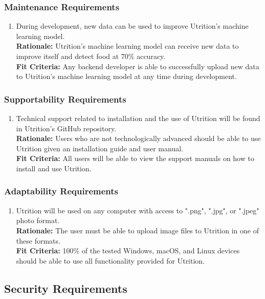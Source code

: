 \documentclass[12pt]{article}
\begin{document}
\subsubsection{Maintenance Requirements}
\begin{enumerate}[{MS}1. ] 
	\item During development, new data can be used to improve Utrition’s machine learning model.\\
	\textbf{Rationale:} Utrition’s machine learning model can receive new data to improve itself and detect food at 70\% accuracy.\\	
	\textbf{Fit Criteria:} Any backend developer is able to successfully upload new data to Utrition’s machine learning model at any time during development. 
\end{enumerate}

\subsubsection{Supportability Requirements}
\begin{enumerate}[{MS}2. ] 
	\item Technical support related to installation and the use of Utrition will be found in Utrition’s GitHub repository. \\
	\textbf{Rationale:} Users who are not technologically advanced should be able to use Utrition given an installation guide and user manual.\\	
	\textbf{Fit Criteria:} All users will be able to view the support manuals on how to install and use Utrition.
\end{enumerate}

\subsubsection{Adaptability Requirements}
\begin{enumerate}[{MS}3. ] 
	\item Utrition will be used on any computer with access to ".png", ".jpg", or ".jpeg" photo format.\\
	\textbf{Rationale:} The user must be able to upload image files to Utrition in one of these formats. \\
	\textbf{Fit Criteria:} 100\% of the tested Windows, macOS, and Linux devices should be able to use all functionality provided for Utrition.
\end{enumerate}


\subsection{Security Requirements}
\end{document}
